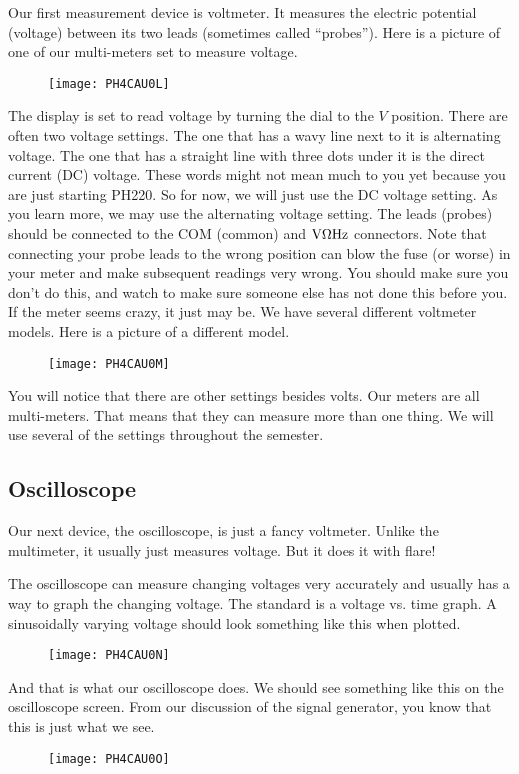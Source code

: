 Our first measurement device is voltmeter. It measures the electric
potential (voltage) between its two leads (sometimes called
\textquotedblleft probes\textquotedblright ). Here is a picture of one of
our multi-meters set to measure voltage.\begin{figure}[h!]
\texttt{[image: PH4CAU0L]}
\end{figure}The display is set to read
voltage by turning the dial to the $\unit{V}$ position. There are often two
voltage settings. The one that has a wavy line next to it is alternating
voltage. The one that has a straight line with three dots under it is the
direct current (DC) voltage. These words might not mean much to you yet
because you are just starting PH220. So for now, we will just use the DC
voltage setting. As you learn more, we may use the alternating voltage
setting. The leads (probes) should be connected to the COM (common) and $%
\unit{V}\unit{%
\Omega%
}\unit{Hz}$ connectors. Note that connecting your probe leads to the wrong
position can blow the fuse (or worse) in your meter and make subsequent
readings very wrong. You should make sure you don't do this, and watch to
make sure someone else has not done this before you. If the meter seems
crazy, it just may be. We have several different voltmeter models. Here is a
picture of a different model.

\begin{figure}[h!]
\texttt{[image: PH4CAU0M]}
\end{figure}You will notice that there are
other settings besides volts. Our meters are all multi-meters. That means
that they can measure more than one thing. We will use several of the
settings throughout the semester.

\subsection{Oscilloscope}

Our next device, the oscilloscope, is just a fancy voltmeter. Unlike the
multimeter, it usually just measures voltage. But it does it with flare!

The oscilloscope can measure changing voltages very accurately and usually
has a way to graph the changing voltage. The standard is a voltage vs. time
graph. A sinusoidally varying voltage should look something like this when
plotted. \begin{figure}[h!]
\texttt{[image: PH4CAU0N]}
\end{figure}And that is what our oscilloscope
does. We should see something like this on the oscilloscope screen. From our
discussion of the signal generator, you know that this is just what we see.%
\begin{figure}[h!]
\texttt{[image: PH4CAU0O]}
\end{figure}

